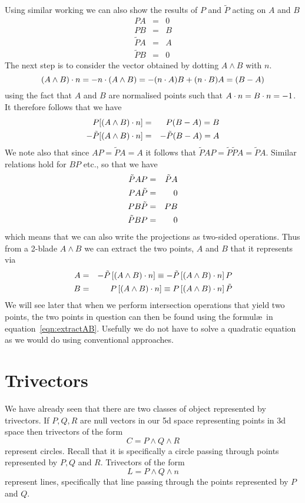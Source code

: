 Using similar working we can also show the results of
$P$ and $\tilde{P}$ acting on $A$ and $B$
%
\begin{eqnarray}
 PA & = & 0 \\
 PB & = & B \\
 \tilde{P}A & = & A  \\
 \tilde{P}B & = & 0
\end{eqnarray}
%
The next step is to consider the vector obtained by
dotting $A\wedge B$ with $n$.
%
\begin{equation}
  (A\wedge B)\cdot n = -n\cdot (A\wedge B) = -(n\cdot A)B + (n\cdot
  B)A = (B-A)
\end{equation}
%
using the fact that $A$ and $B$ are normalised points
such that $A\cdot n=B\cdot n = -1$. It therefore follows that
we have
%
\begin{eqnarray}
  P [(A\wedge B)\cdot n] & = & P(B - A) = B \\
 - \tilde{P} [(A\wedge B)\cdot n] & = & -\tilde{P}(B - A) = A
\end{eqnarray}
%
We note also that since $AP = \tilde{P}A = A$ 
it follows that
$\tilde{P}A P = \tilde{P}\tilde{P}A = \tilde{P}A$.
Similar relations hold for $BP$ etc., so that we have
%
\begin{eqnarray}
 \tilde{P}AP & = & \tilde{P}A \nonumber \\
 PA\tilde{P} & = & 0 \nonumber \\
{P}B\tilde{P} & = & {P}B \nonumber \\
\tilde{P}BP & = & 0 \nonumber
\end{eqnarray}
%
which means that we can also write the projections as
two-sided operations.
%
Thus from a 2-blade $A\wedge B$ we can extract the two
points, $A$ and $B$ that it represents via
%
\begin{eqnarray}
A & = & -\tilde{P}\left[(A\wedge B)\cdot n\right] \equiv
-\tilde{P}\left[(A\wedge B)\cdot n\right]P  \nonumber
\\
B & = & {P}\left[(A\wedge B)\cdot n\right] \equiv
{P}\left[(A\wedge B)\cdot n\right]\tilde{P} \label{eqn:extractAB}
\end{eqnarray}
%
We will see later that when we perform intersection operations
that yield two points, the two points in question can then be found 
using the formul\ae\ in equation~\ref{eqn:extractAB}. Usefully we do not 
have to solve a quadratic equation as we would do using
conventional approaches.

\section{Trivectors}
We have already seen that there are two classes of object
represented by trivectors. If $P,Q,R$ are null vectors in our 5d
space representing points in 3d space then trivectors of the form
%
\[ C = P\wedge Q\wedge R \]
%
represent circles. Recall that it is specifically a circle 
passing through points represented by $P,Q$ and $R$. Trivectors of the form
%
\[ L = P\wedge Q\wedge n \]
%
represent lines, specifically that line passing through the
points represented by $P$ and $Q$.

